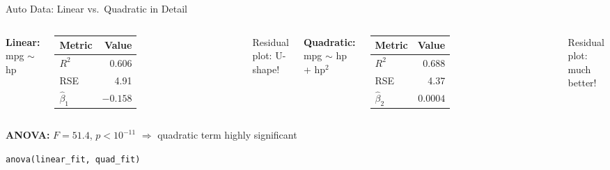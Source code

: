 \documentclass[aspectratio=169, 11pt]{beamer}
\begin{document}
\begin{frame}{Auto Data: Linear vs.\ Quadratic in Detail}
\begin{columns}
\textbf{Linear:} mpg $\sim$ hp

\begin{tabular}{lr}
\toprule
Metric & Value \\
\midrule
$R^2$ & 0.606 \\
RSE & 4.91 \\
$\hat{\beta}_1$ & $-0.158$ \\
\bottomrule
\end{tabular}

\vspace{0.3em}
Residual plot: U-shape!

\textbf{Quadratic:} mpg $\sim$ hp + hp$^2$

\begin{tabular}{lr}
\toprule
Metric & Value \\
\midrule
$R^2$ & \textcolor{softgreen}{0.688} \\
RSE & \textcolor{softgreen}{4.37} \\
$\hat{\beta}_2$ & $0.0004$ \\
\bottomrule
\end{tabular}

\vspace{0.3em}
Residual plot: much better!
\end{columns}

\vspace{0.5em}
\centering
\textbf{ANOVA:} $F = 51.4$, $p < 10^{-11}$ $\Rightarrow$ quadratic term highly significant

\texttt{anova(linear\_fit, quad\_fit)}
\end{frame}
\end{document}
